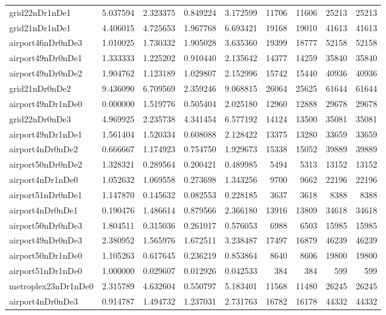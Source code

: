 \begin{longtable}{|l|r|r|r|r|r|r|r|r|}
grid22nDr1nDe1 & 5.037594 & 2.323375 & 0.849224 & 3.172599 & 11706 & 11606 & 25213 & 25213 \\
grid21nDr1nDe1 & 4.406015 & 4.725653 & 1.967768 & 6.693421 & 19168 & 19010 & 41613 & 41613 \\
airport46nDr0nDe3 & 1.010025 & 1.730332 & 1.905028 & 3.635360 & 19399 & 18777 & 52158 & 52158 \\
airport49nDr0nDe1 & 1.333333 & 1.225202 & 0.910440 & 2.135642 & 14377 & 14259 & 35840 & 35840 \\
airport49nDr0nDe2 & 1.904762 & 1.123189 & 1.029807 & 2.152996 & 15742 & 15440 & 40936 & 40936 \\
grid21nDr0nDe2 & 9.436090 & 6.709569 & 2.359246 & 9.068815 & 26064 & 25625 & 61644 & 61644 \\
airport49nDr1nDe0 & 0.000000 & 1.519776 & 0.505404 & 2.025180 & 12960 & 12888 & 29678 & 29678 \\
grid22nDr0nDe3 & 4.969925 & 2.235738 & 4.341454 & 6.577192 & 14124 & 13500 & 35081 & 35081 \\
airport49nDr1nDe1 & 1.561404 & 1.520334 & 0.608088 & 2.128422 & 13375 & 13280 & 33659 & 33659 \\
airport4nDr0nDe2 & 0.666667 & 1.174923 & 0.754750 & 1.929673 & 15338 & 15052 & 39889 & 39889 \\
airport50nDr0nDe2 & 1.328321 & 0.289564 & 0.200421 & 0.489985 & 5494 & 5313 & 13152 & 13152 \\
airport4nDr1nDe0 & 1.052632 & 1.069558 & 0.273698 & 1.343256 & 9700 & 9662 & 22196 & 22196 \\
airport51nDr0nDe1 & 1.147870 & 0.145632 & 0.082553 & 0.228185 & 3637 & 3618 & 8388 & 8388 \\
airport4nDr0nDe1 & 0.190476 & 1.486614 & 0.879566 & 2.366180 & 13916 & 13809 & 34618 & 34618 \\
airport50nDr0nDe3 & 1.804511 & 0.315036 & 0.261017 & 0.576053 & 6988 & 6503 & 15985 & 15985 \\
airport49nDr0nDe3 & 2.380952 & 1.565976 & 1.672511 & 3.238487 & 17497 & 16879 & 46239 & 46239 \\
airport50nDr1nDe0 & 1.105263 & 0.617645 & 0.236219 & 0.853864 & 8640 & 8606 & 19800 & 19800 \\
airport51nDr1nDe0 & 1.000000 & 0.029607 & 0.012926 & 0.042533 & 384 & 384 & 599 & 599 \\
metroplex23nDr1nDe0 & 2.315789 & 4.632604 & 0.550797 & 5.183401 & 11568 & 11480 & 26245 & 26245 \\
airport4nDr0nDe3 & 0.914787 & 1.494732 & 1.237031 & 2.731763 & 16782 & 16178 & 44332 & 44332 \\

\end{longtable}
